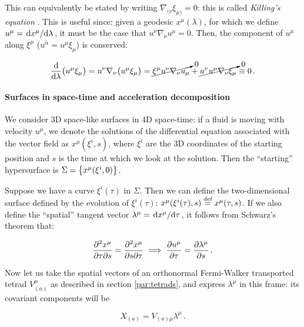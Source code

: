 \documentclass[main.tex]{subfiles}
\begin{document}
This can equivalently be stated by writing \(\nabla_{(\nu} \xi_{\mu)}=0\): this is called \emph{Killing's equation} \cite[section 25.2, page 650]{MisnerThorneWheeler:1973}. This is useful since: given a geodesic \(x^\mu(\lambda)\), for which we define \(u^\mu = \dv*{x^\mu}{\lambda} \), it must be the case that \(u^\nu \nabla_\nu u^\mu = 0 \). Then, the component of \(u^\mu\) along \(\xi^\mu\) (\(u^{\widetilde{\alpha}} = u^\mu \xi_\mu\)) is conserved:

\begin{equation}
    \dv{}{\lambda} \qty(u^\mu \xi_\mu) = u^\nu \nabla_\nu \qty(u^\mu \xi_\mu)
    = \cancelto{0}{\xi^\mu u^\nu \nabla_\nu u_\mu} + \cancelto{0}{u^\nu u^\mu \nabla_\nu \xi_\mu} \equiv 0 \,.
\end{equation}

\paragraph{Surfaces in space-time and acceleration decomposition}

We consider 3D space-like surfaces in 4D space-time: if a fluid is moving with velocity \(u^\mu\), we denote the solutions of the differential equation associated with the vector field as \(x^\mu (\xi^i, s)\), where \(\xi^i\) are the 3D coordinates of the starting position and \(s\) is the time at which we look at the solution. Then the ``starting'' hypersurface is \(\Sigma = \qty{x^\mu (\xi^i, 0)}\).

Suppose we have a curve \(\xi^i(\tau)\) in \(\Sigma\). Then we can define the two-dimensional surface defined by the evolution of \(\xi^i(\tau)\): \(x^{\mu} (\xi^i(\tau), s) \stackrel{\text{def}}{=} x^\mu (\tau, s)\).
If we also define the ``spatial'' tangent vector \(\lambda^\mu = \dv*{x^\mu}{\tau} \), it follows from Schwarz's theorem that:

\begin{equation} \label{eq:schwarz-spacetime-tube}
    \pdv{x^\mu}{\tau}{s} =
    \pdv{x^\mu}{s}{\tau}
    \implies
    \pdv{u^\mu}{\tau} = \pdv{\lambda^\mu}{s} \,.
\end{equation}

Now let us take the spatial vectors of an orthonormal Fermi-Walker transported tetrad \(V^\mu_{(a)}\) as described in section \ref{par:tetrads}, and express \(\lambda^\mu\) in this frame: its covariant components will be

\begin{equation} \label{eq:tetrad-components-lambda}
    X_{(a)} = V_{(a)\mu} \lambda^\mu \,.
\end{equation}
\end{document}
